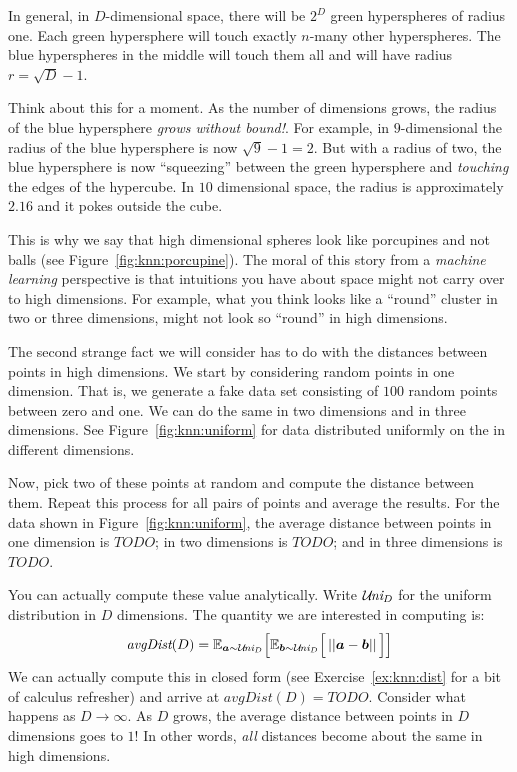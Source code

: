 In general, in $D$-dimensional space, there will be $2^D$ green
hyperspheres of radius one.  Each green hypersphere will touch exactly
$n$-many other hyperspheres.  The blue hyperspheres in the middle will
touch them all and will have radius $r = \sqrt D - 1$.

Think about this for a moment.  As the number of dimensions grows, the
radius of the blue hypersphere \emph{grows without bound!}.  For
example, in $9$-dimensional the radius of the blue hypersphere is now
$\sqrt9-1 = 2$.  But with a radius of two, the blue hypersphere is now
``squeezing'' between the green hypersphere and \emph{touching} the
edges of the hypercube.  In $10$ dimensional space, the radius is
approximately $2.16$ and it pokes outside the cube.


This is why we say that high dimensional spheres look like porcupines
and not balls (see Figure~\ref{fig:knn:porcupine}).  The moral of this
story from a \emph{machine learning} perspective is that intuitions
you have about space might not carry over to high dimensions.  For
example, what you think looks like a ``round'' cluster in two or three
dimensions, might not look so ``round'' in high dimensions.


The second strange fact we will consider has to do with the distances
between points in high dimensions.  We start by considering random
points in one dimension.  That is, we generate a fake data set
consisting of $100$ random points between zero and one.  We can do the
same in two dimensions and in three dimensions.  See
Figure~\ref{fig:knn:uniform} for data distributed uniformly on the
 in different dimensions.

Now, pick two of these points at random and compute the distance
between them.  Repeat this process for all pairs of points and average
the results.  For the data shown in Figure~\ref{fig:knn:uniform}, the
average distance between points in one dimension is $TODO$; in two
dimensions is $TODO$; and in three dimensions is $TODO$.

You can actually compute these value analytically.  Write $\mathcal{U}\hspace{-0.5mm}\textit{ni}_D$ for
the uniform distribution in $D$ dimensions.  The quantity we are
interested in computing is:
\begin{equation} \label{eq:knn:dist}
  \textit{avgDist}(D)
  = \Ep_{\vec a \sim \Uni_D} \Big[
    \Ep_{\vec b \sim \Uni_D} \Big[
      \norm{\vec a - \vec b}
      \Big] \Big]
\end{equation}
We can actually compute this in closed form (see
Exercise~\ref{ex:knn:dist} for a bit of calculus refresher) and arrive
at $\textit{avgDist}(D) = TODO$.  Consider what happens as $D
\rightarrow \infty$.  As $D$ grows, the average distance between
points in $D$ dimensions goes to $1$!  In other words, \emph{all}
distances become about the same in high dimensions.

